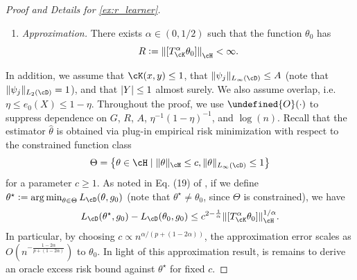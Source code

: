 \documentclass[11pt]{article} %
\newcommand{\pref}[1]{\cref{#1}}
\theoremstyle{theorem}  %
\theoremstyle{plain}
\DeclarePairedDelimiter{\abs}{\lvert}{\rvert} %
\DeclarePairedDelimiter{\brk}{[}{]}
\DeclarePairedDelimiter{\crl}{\{}{\}}
\DeclarePairedDelimiter{\nrm}{\|}{\|}
\DeclareMathOperator*{\argmin}{arg\,min} %
\newcommand{\ldef}{\vcentcolon=}
\newcommand{\wt}[1]{\widetilde{#1}}
\newcommand{\wh}[1]{\widehat{#1}}
\let\wt\undefined
\newcommand{\wt}[1]{\widetilde{#1}}
\newcommand{\Ot}{\wt{O}}
\newcommand{\bigoh}{O}
\newcommand{\bigoht}{\Ot}
\newcommand{\Tk}{T_{\cK}}
\newcommand{\poprisk}{L_{\cD}}
\newcommand{\esttwo}{\wh{\theta}}
\newcommand{\target}{\Theta}
\newcommand{\besttwo}{\theta^{\star}}
\newcommand{\gtone}{g_0}
\newcommand{\gttwo}{\theta_0}
\begin{document}
\begin{proof}[Proof and Details for \pref{ex:r_learner}]
\begin{enumerate}
  \[
    G\ldef{}\sup_{j\geq{}1}j^{1/p}\sigma_j<\infty.
  \]
\item \emph{Approximation.} There exists $\alpha\in{}(0,1/2)$ such
  that the function $\theta_0$ has
  \[
    R\ldef{}\nrm*{\brk{\Tk^{\alpha}\theta_0}}_{\cH}<\infty.
  \]
\end{enumerate}
In addition, we assume that $\cK(x,y)\leq{}1$, that $\nrm{\psi_j}_{L_{\infty}(\cD)}\leq{}A$ (note that $\nrm{\psi_j}_{L_{2}(\cD)}=1$), and that $\abs{Y}\leq{}1$ almost surely. We also assume overlap, i.e. $\eta\leq{}e_0(X)\leq{}1-\eta$.
%
Throughout the proof, we use $\bigoht(\cdot)$ to suppress dependence on $G$, $R$, $A$, $\eta^{-1}(1-\eta)^{-1}$, and $\log(n)$. Recall that the estimator $\esttwo$ is obtained via plug-in empirical risk minimization with respect to the constrained function class
\[
\target = \crl*{\theta\in\cH\mid{}\nrm{\theta}_{\cH}\leq{}c, \nrm{\theta}_{L_{\infty}(\cD)}\leq{}1}
\]
for a parameter $c\geq{}1$. As noted in Eq. (19) of \cite{nie2017quasi}, if we define $\besttwo\ldef\argmin_{\theta\in\Theta}\poprisk(\theta,\gtone)$ (note that $\besttwo\neq\gttwo$, since $\Theta$ is constrained), we have
\begin{align}
  \poprisk(\besttwo,\gtone) - \poprisk(\gttwo,\gtone)
  \leq{} c^{2-\frac{1}{\alpha}}\nrm*{\brk{\Tk^{\alpha}\theta_0}}_{\cH}^{1/\alpha}.
  \label{eq:rlearner_approx}
\end{align}
In particular, by choosing $c\propto{}n^{\alpha/(p+(1-2\alpha))}$, the approximation error scales as $\bigoh(n^{-\frac{1-2\alpha}{p+(1-2\alpha)}})$ to $\gttwo$. In light of this approximation result, is remains to derive an oracle excess risk bound against $\besttwo$ for fixed $c$.


\end{proof}
\end{document}
